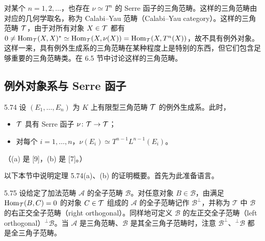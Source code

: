 
对某个 $n = 1,2,\ldots$，也存在 $\nu \simeq T^{n}$ 的 Serre 函子的三角范畴。这样的三角范畴由对应的几何学取名，称为 Calabi–Yau 范畴（Calabi–Yau category）。这样的三角范畴 $\mathcal{T}$，由于对所有对象 $X \in \mathcal{T}$ 都有 $0 \ne \operatorname{Hom}_{\mathcal{T}}(X,X)^{*} \simeq \operatorname{Hom}_{\mathcal{T}}(X,\nu(X)) = \operatorname{Hom}_{\mathcal{T}}(X,T^{n}(X))$，故不具有例外对象。这样一来，具有例外生成系的三角范畴在某种程度上是特别的东西，但它们包含足够重要的三角范畴类。在 6.5 节中讨论这样的三角范畴。


\subsection{例外对象系与 Serre 函子}

\begin{theorem}{5.74} 设 $(E_{1},\ldots,E_{n})$ 为 $K$ 上有限型三角范畴 $\mathcal{T}$ 的例外生成系。此时，
\begin{itemize}
  \item[(a)] $\mathcal{T}$ 具有 Serre 函子 $\nu \colon \mathcal{T} \to \mathcal{T}$；
  \item[(b)] 对每个 $i = 1,\ldots,n$，$\nu(E_{i}) \simeq T^{n-1}L^{n-1}(E_{i})$。
\end{itemize}
（(a) 是 [9]，(b) 是 [7]。）\end{theorem}

以下本节中说明定理 5.74(a)、(b) 的证明概要。首先为此准备语言。

\begin{definition}{5.75} 设给定了加法范畴 $\mathcal{A}$ 的全子范畴 $\mathcal{B}$。对任意对象 $B \in \mathcal{B}$，由满足 $\operatorname{Hom}_{\mathcal{T}}(B,C) = 0$ 的对象 $C \in \mathcal{T}$ 组成的 $\mathcal{A}$ 的全子范畴记作 $\mathcal{B}^{\perp}$，并称为 $\mathcal{T}$ 中 $\mathcal{B}$ 的右正交全子范畴（right orthogonal）。同样地可定义 $\mathcal{B}$ 的左正交全子范畴（left orthogonal）${}^{\perp}\mathcal{B}$。当 $\mathcal{A}$ 是三角范畴、$\mathcal{B}$ 是其全三角子范畴时，注意 $\mathcal{B}^{\perp}$、${}^{\perp}\mathcal{B}$ 都是全三角子范畴。\end{definition}

